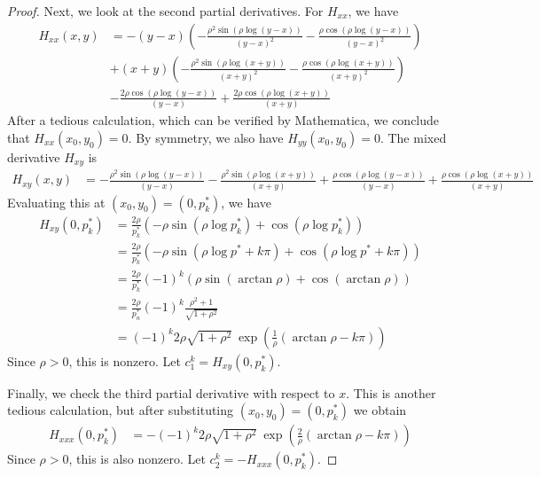 \documentclass[thesis.tex]{subfiles}
\begin{document}
\begin{lemma}
\begin{proof}
Next, we look at the second partial derivatives. For $H_{xx}$, we have
\begin{align*}
H_{xx}(x, y) &= 
-(y-x) \left(-\frac{\rho^2 \sin \left(\rho \log (y-x)\right)}{(y-x)^2}-\frac{\rho
   \cos \left(\rho \log (y-x) \right)}{(y-x)^2}\right)\\
   &+(x+y) \left(-\frac{\rho^2
   \sin \left(\rho \log (x+y)\right)}{(x+y)^2}-\frac{\rho \cos \left( \rho
   \log (x+y)\right)}{(x+y)^2}\right)\\
   &-\frac{2 \rho \cos \left(\rho \log
   (y-x) \right)}{(y-x)}+\frac{2 \rho \cos \left( \rho \log (x+y) \right)}{
   (x+y)}
\end{align*}
After a tedious calculation, which can be verified by Mathematica, we conclude that $H_{xx}(x_0, y_0) = 0$. By symmetry, we also have $H_{yy}(x_0, y_0) = 0$. The mixed derivative $H_{xy}$ is
\begin{align*}
H_{xy}(x, y) &= -\frac{\rho^2 \sin \left(\rho \log (y-x)\right)}{(y-x)}-\frac{\rho^2 \sin
   \left(\rho \log (x+y)\right)}{(x+y)}+\frac{\rho \cos \left(\rho \log (y-x)\right)}{(y-x)}+\frac{\rho \cos \left( \rho \log (x+y) \right)}{(x+y)}
\end{align*}
Evaluating this at $(x_0, y_0) = \left(0, p^*_k \right)$, we have
\begin{align*}
H_{xy}(0, p^*_k) &= \frac{2 \rho}{p^*_k}\left( -\rho \sin \left(\rho \log p^*_k \right) + \cos \left(\rho \log p^*_k \right) \right)\\
&= \frac{2 \rho}{p^*_k}\left( -\rho \sin \left(\rho \log p^* + k \pi \right) + \cos \left(\rho \log p^* + k \pi \right) \right) \\
&= \frac{2 \rho}{p^*_k} (-1)^k \left( \rho \sin \left(\arctan \rho \right) + \cos \left(\arctan \rho \right) \right)\\ 
&= \frac{2 \rho}{p_n^*} (-1)^k \frac{\rho^2 + 1}{\sqrt{1 + \rho^2}} \\
&= (-1)^k 2 \rho \sqrt{1 + \rho^2} \: \exp{\left(\frac{1}{\rho} (\arctan \rho - k \pi) \right)}
\end{align*}
Since $\rho > 0$, this is nonzero. Let $c_1^k = H_{xy}(0, p^*_k)$. 

Finally, we check the third partial derivative with respect to $x$. This is another tedious calculation, but after substituting $(x_0, y_0) = \left(0, p^*_k \right)$ we obtain
\begin{align*}
H_{xxx}(0, p_k^*)
&= -(-1)^k 2 \rho \sqrt{1 + \rho^2} \: \exp{\left(\frac{2}{\rho} (\arctan \rho - k \pi) \right)}
\end{align*}
Since $\rho > 0$, this is also nonzero. Let $c_2^k = -H_{xxx}(0, p^*_k)$.


\end{proof}
\end{lemma}
\end{document}
